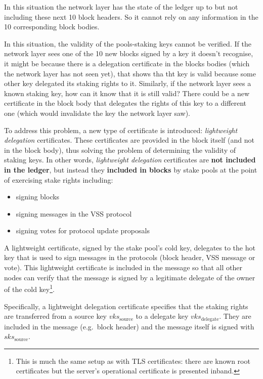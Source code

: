 \documentclass[11pt,a4paper]{article}
\begin{document}
In this situation the network layer has the state of the ledger up to but not
including these next 10 block headers. So it cannot rely on any information in
the 10 corresponding block bodies.

In this situation, the validity of the pools-staking keys cannot be verified.
If the network layer sees one of the 10 new blocks signed by a key it doesn't
recognise, it might be because there is a delegation certificate in the blocks
bodies (which the network layer has not seen yet), that shows tha tht key is
valid because some other key delegated its staking rights to it. Similarly, if
the network layer sees a known staking key, how can it know that it is still
valid? There could be a new certificate in the block body that delegates the
rights of this key to a different one (which would invalidate the key the
network layer saw).

To address this problem, a new type of certificate is introduced:
\emph{lightweight delegation} certificates. These certificates are provided in
the block itself (and not in the block body), thus solving the problem of
determining the validity of staking keys. In other words, \emph{lightweight
  delegation} certificates are \textbf{not included in the ledger}, but instead
they \textbf{included in blocks} by
stake pools at the point of exercising stake rights including:

\begin{itemize}
\item
  signing blocks
\item
  signing messages in the VSS protocol
\item
  signing votes for protocol update proposals
\end{itemize}

A lightweight
certificate, signed by the stake pool's cold key, delegates to the hot
key that is used to sign messages in the protocols (block header, VSS
message or vote). This lightweight certificate is included in the
message so that all other nodes can verify that the message is signed by
a legitimate delegate of the owner of the cold key\footnote{This is much
  the same setup as with TLS certificates: there are known root
  certificates but the server's operational certificate is presented
  inband.}.

Specifically, a lightweight delegation certificate specifies that the
staking rights are transferred from a source key \(vks_\text{source}\)
to a delegate key \(vks_\text{delegate}\). They are included in the
message (e.g.~block header) and the message itself is signed with
\(sks_\text{source}\).
\end{document}
